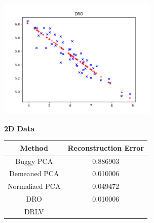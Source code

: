 \begin{itemize}
\begin{soln}
\begin{center}
  \end{center}
  \includegraphics[width=3in]{../figs/dro.png}

  \begin{center}
    \textbf{2D Data} \\
    \begin{tabular}{ c  c }
      \hline
      Method & Reconstruction Error \\ \hline
      Buggy PCA & 0.886903 \\
      Demeaned PCA & 0.010006 \\
      Normalized PCA & 0.049472 \\
      DRO & 0.010006 \\
      DRLV & \\
      \hline
    \end{tabular}
  \end{center}


\end{soln}
\end{itemize}
